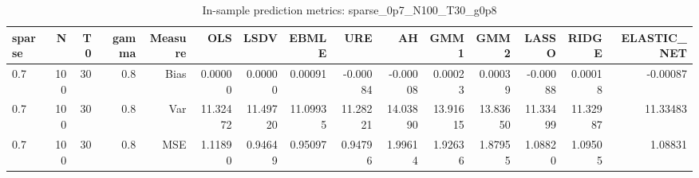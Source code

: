 \begin{table}[!htbp]\centering
\caption{In-sample prediction metrics: sparse_0p7_N100_T30_g0p8}
\label{tab:table2_sparse_0p7_N100_T30_g0p8}
\begin{tabular}{lrrrrrrrrrrrrrr}
\hline
sparse & N & T0 & gamma & Measure & OLS & LSDV & EBMLE & URE & AH & GMM1 & GMM2 & LASSO & RIDGE & ELASTIC_NET \\
\hline
0.7 & 100 & 30 & 0.8 & Bias & 0.00000 & 0.00000 & 0.00091 & -0.00084 & -0.00008 & 0.00023 & 0.00039 & -0.00088 & 0.00018 & -0.00087 \\
0.7 & 100 & 30 & 0.8 & Var & 11.32472 & 11.49720 & 11.09935 & 11.28221 & 14.03890 & 13.91615 & 13.83650 & 11.33499 & 11.32987 & 11.33483 \\
0.7 & 100 & 30 & 0.8 & MSE & 1.11890 & 0.94649 & 0.95097 & 0.94796 & 1.99614 & 1.92636 & 1.87955 & 1.08820 & 1.09505 & 1.08831 \\
\hline
\end{tabular}
\end{table}

